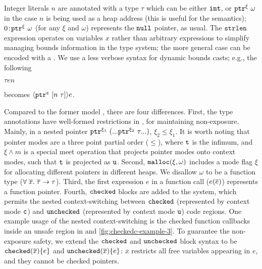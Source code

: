 Integer literals $n$ are annotated with a type $\tau$ which can be either
$\tint$, or $\tptr{\omega}{\xi}$ in the case $n$ is being used as 
a heap address (this is useful for the semantics);
$\evalue{0}{\tptr{\omega}{\xi}}$ (for any $\xi$ and $\omega$) represents the $\enull$ pointer, as usual. 
The $\texttt{strlen}$ expression operates on variables $x$
rather than arbitrary expressions to simplify managing
bounds information in the type system; the more general case can be
encoded with a . We use a less verbose syntax for dynamic bounds
casts; e.g., the following %

$\tau$\code{>>(}$e$$n$\code{))}

\noindent
becomes $\edyncast{\tptr{\tarrayb{n}{\tau}}{\cmode}}{e}$. 


Compared to the former \checkedc model \cite{li22checkedc},
there are four differences.
First, the \systemname type annotations have well-formed restrictions in , 
for maintaining non-exposure.
Mainly, in a nested pointer $\tptr{(... \tptr{\tau}{\xi_2} ...)}{\xi_1}$, $\xi_2\le \xi_1$.
It is worth noting that pointer modes are a three point partial order ($\le$),
where $\tmode$ is the infimum, and
$\xi\wedge m$ is a special meet operation that projects pointer modes onto context modes,
such that $\tmode$ is projected as $\umode$.
Second, $\emalloc{\xi}{\omega}$ includes a mode flag
$\xi$ for allocating different pointers in different heaps.
We disallow $\omega$ to be a function type ($\tfun{\overline{x}}{\overline{\tau}}{\tau}$).
Third, the first expression $e$ in a function call ($\ecall{e}{\overline{e}}$) represents a function pointer.
Fourth, $\echeckedtext$ blocks are added to the system, 
which permits the nested context-switching between $\echeckedtext$ (represented by context mode $\cmode$)
and $\euncheckedtext$ (represented by context mode $\umode$) code regions.
One example usage of the nested context-switching is the checked function callbacks inside 
an unsafe region in  and \ref{fig:checkedc-example-3}.
To guarantee the non-exposure safety,
 we extend the $\echeckedtext$ and $\euncheckedtext$ block syntax to be 
$\echecked{\overline{x}}{e}$ and $\eunchecked{\overline{x}}{e}$:
$\overline{x}$ restricts all free variables appearing in $e$, and they cannot be checked pointers.

